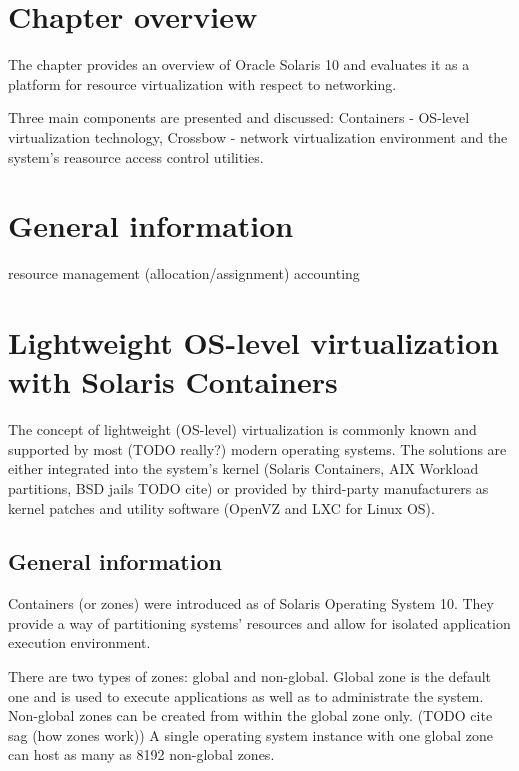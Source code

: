 \documentclass[11pt]{book}
\begin{document}
    \section*{Chapter overview}

      The chapter provides an overview of Oracle Solaris 10 and evaluates it as a platform for resource virtualization
      with respect to networking.

      Three main components are presented and discussed: Containers - OS-level virtualization technology, Crossbow -
      network virtualization environment and the system's reasource access control utilities.


    \section{General information}

      resource management (allocation/assignment)
      accounting


    \section{Lightweight OS-level virtualization with Solaris Containers}


      The concept of lightweight (OS-level) virtualization is commonly known and supported by most (TODO really?)
      modern operating systems. The solutions are either integrated into the system's kernel (Solaris Containers, AIX
      Workload partitions, BSD jails TODO cite) or provided by third-party manufacturers as kernel patches and utility
      software (OpenVZ and LXC for Linux OS).


      \subsection{General information}
      \label{sub:}

        Containers (or zones) were introduced as of Solaris Operating System 10. They provide a way of partitioning systems'
        resources and allow for isolated application execution environment.

        There are two types of zones: global and non-global. Global zone is the default one and is used to execute
        applications as well as to administrate the system. Non-global zones can be created from within the global zone
        only.
        (TODO cite sag (how zones work)) A single operating system instance with one global zone can host as many as
        8192 non-global zones.
\end{document}

